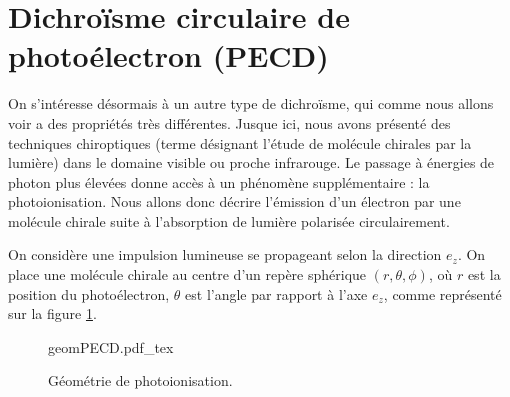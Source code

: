 \section{Dichroïsme circulaire de photoélectron (PECD)}
On s'intéresse désormais à un autre type de dichroïsme, qui comme nous allons voir a des propriétés très différentes. Jusque ici, nous avons présenté des techniques chiroptiques (terme désignant l'étude de molécule chirales par la lumière) dans le domaine visible ou proche infrarouge. Le passage à énergies de photon plus élevées donne accès à un phénomène supplémentaire : la photoionisation. Nous allons donc décrire l'émission d'un électron par une molécule chirale suite à l'absorption de lumière polarisée circulairement. 

On considère une impulsion lumineuse se propageant selon la direction $e_z$. On place une molécule chirale au centre d'un repère sphérique $(r,\theta,\phi)$, où $r$ est la position du photoélectron, $\theta$ est l'angle par rapport à l'axe $e_z$, comme représenté sur la figure \ref{fig:geomPECD}.

\begin{figure}[!ht]
\centering
\def\svgwidth{0.5\columnwidth}
{geomPECD.pdf_tex}
\caption{Géométrie de photoionisation.}
\label{fig:geomPECD}
\end{figure}


